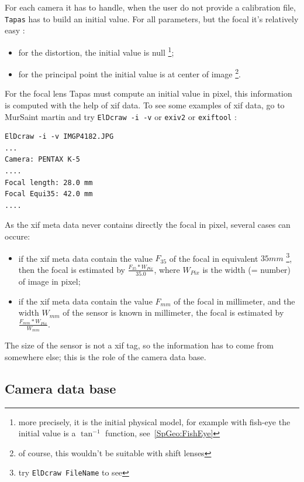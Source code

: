 For each camera it has to handle, when the user do not provide a calibration
file, {\tt Tapas} has to build an initial  value. For all parameters, but the
focal it's relatively easy :

\begin{itemize}
  \item for the distortion, the initial value is null \footnote{more
	precisely, it is the initial physical model, for example
	with fish-eye the initial value is a $\tan^{-1} $ function, see~\ref{SpGeo:FishEye}};

  \item for the principal point the initial value is at center of image
	\footnote{ of course, this wouldn't be suitable with shift lenses}.
\end{itemize}

For the focal lens Tapas must compute an initial value in pixel, this information is
computed with the help of xif data. To see some examples of xif data, go to MurSaint martin
and try {\tt ElDcraw -i -v} or {\tt exiv2} or {\tt exiftool} :

\begin{verbatim}
ElDcraw -i -v IMGP4182.JPG
...
Camera: PENTAX K-5
....
Focal length: 28.0 mm
Focal Equi35: 42.0 mm
....
\end{verbatim}

As the xif meta data never contains directly the focal in pixel,
several cases can  occure:

\begin{itemize}
  \item if the xif meta data contain the value $F_{35}$ of the focal in equivalent $35mm$
       \footnote{try {\tt ElDcraw FileName} to see}, then the focal is estimated by
       $\frac{F_{35} * W_{Pix}}{35.0}$, where $W_{Pix}$ is the width (= number)
       of image in pixel;

  \item if the xif meta data contain the value $F_{mm}$ of the focal in millimeter,
	and the width  $W_{mm}$  of the sensor is known in millimeter, the focal is estimated
	by $\frac{F_{mm} * W_{Pix}}{W_{mm}}$.

\end{itemize}

The size of the sensor is not a xif tag, so the information has to come from
somewhere else; this is the role of the camera data base.


\subsection{Camera data base}
\label{CamDB}

